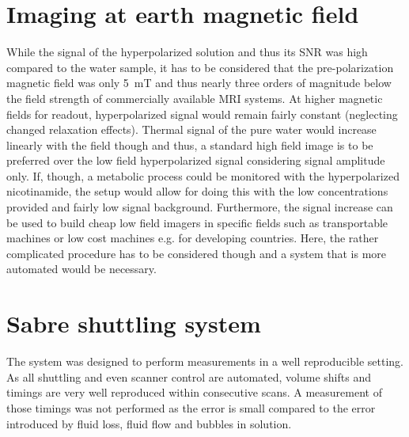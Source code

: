     \section{Imaging at earth magnetic field}
    While the signal of the hyperpolarized solution and thus its SNR was high compared to the water sample, it has to be considered that the pre-polarization magnetic field was only \SI{5}{\milli\tesla} and thus nearly three orders of magnitude below the field strength of commercially available MRI systems. At higher magnetic fields for readout, hyperpolarized signal would remain fairly constant (neglecting changed relaxation effects). Thermal signal of the pure water would increase linearly with the field though and thus, a standard high field image is to be preferred over the low field hyperpolarized signal considering signal amplitude only. If, though, a metabolic process could be monitored with the hyperpolarized nicotinamide, the setup would allow for doing this with the low concentrations provided and fairly low signal background. Furthermore, the signal increase can be used to build cheap low field imagers in specific fields such as transportable machines or low cost machines e.g. for developing countries. Here, the rather complicated procedure has to be considered though and a system that is more automated would be necessary.
    \section{Sabre shuttling system}
        The system was designed to perform measurements in a well reproducible setting. As all shuttling and even scanner control are automated, volume shifts and timings are very well reproduced within consecutive scans. A measurement of those timings was not performed as the error is small compared to the error introduced by fluid loss, fluid flow and bubbles in solution.
